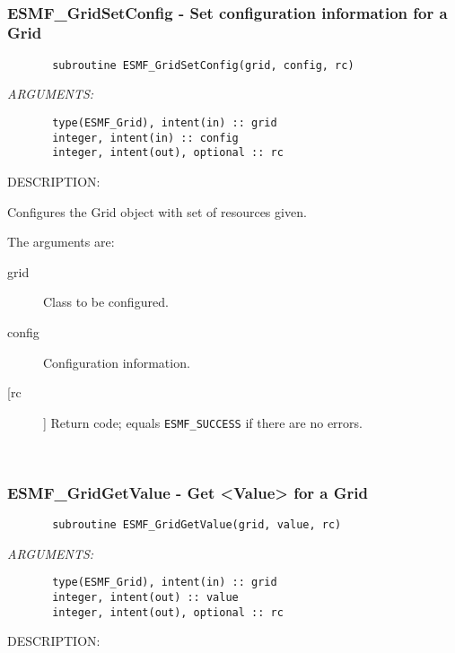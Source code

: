 {%
 
\mbox{}\hrulefill\ 
 
\subsubsection{ESMF\_GridSetConfig - Set configuration information for a Grid}


 
\begin{verbatim}       subroutine ESMF_GridSetConfig(grid, config, rc)\end{verbatim}{\em ARGUMENTS:}
\begin{verbatim}       type(ESMF_Grid), intent(in) :: grid
       integer, intent(in) :: config   
       integer, intent(out), optional :: rc             
 \end{verbatim}
{\sf DESCRIPTION:\\ }


       Configures the Grid object with set of resources given.
  
       The arguments are:
       \begin{description}
       \item[grid] 
            Class to be configured.
       \item[config]
            Configuration information.         
       \item[[rc]] 
            Return code; equals {\tt ESMF\_SUCCESS} if there are no errors.
       \end{description}
   
 
\mbox{}\hrulefill\ 
 
\subsubsection{ESMF\_GridGetValue - Get <Value> for a Grid}


 
\begin{verbatim}       subroutine ESMF_GridGetValue(grid, value, rc)\end{verbatim}{\em ARGUMENTS:}
\begin{verbatim}       type(ESMF_Grid), intent(in) :: grid
       integer, intent(out) :: value
       integer, intent(out), optional :: rc             
 \end{verbatim}
{\sf DESCRIPTION:\\ }


}
